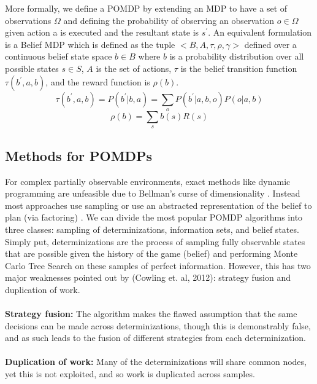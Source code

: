 \documentclass[msc, deptreport, ai, romanprepages]{infthesis}
\begin{document}
More formally, we define a POMDP by extending an MDP to have a set of observations \(\Omega\) and defining the probability of observing an observation \(o \in \Omega\) given action a is executed and the resultant state is \(s^\prime\). An equivalent formulation is a Belief MDP which is defined as the tuple \(<B,A,\tau,\rho,\gamma>\) defined over a continuous belief state space \(b\in B\) where \(b\) is a probability distribution over all possible states \(s\in S\), \(A\) is the set of actions, \(\tau\) is the belief transition function \(\tau(b^\prime,a,b)\), and the reward function is \(\rho (b)\).
\begin{equation}
\tau(b^\prime,a,b) = P(b^\prime|b,a) = \sum_o P(b^\prime|a,b,o)P(o|a,b)
\end{equation}
\begin{equation}
\rho(b) = \sum_s b(s)R(s)
\end{equation}

\subsection{Methods for POMDPs}
For complex partially observable environments, exact methods like dynamic programming are unfeasible due to Bellman’s curse of dimensionality \cite{Mihai}. Instead most approaches use sampling \cite{Silver-veness} or use an abstracted representation of the belief to plan (via factoring) \cite{Kaebling-Lozano}. 
We can divide the most popular POMDP algorithms into three classes: sampling of determinizations, information sets, and belief states. Simply put, determinizations are the process of sampling fully observable states that are possible given the history of the game (belief) and performing Monte Carlo Tree Search on these samples of perfect information. However, this has two major weaknesses pointed out by (Cowling et. al, 2012): strategy fusion and duplication of work. 
\\
\\
\textbf{Strategy fusion:} The algorithm makes the flawed assumption that the same decisions can be made across determinizations, though this is demonstrably false, and as such leads to the fusion of different strategies from each determinization.
\\
\\
\textbf{Duplication of work:} Many of the determinizations will share common nodes, yet this is not exploited, and so work is duplicated across samples.
\end{document}
